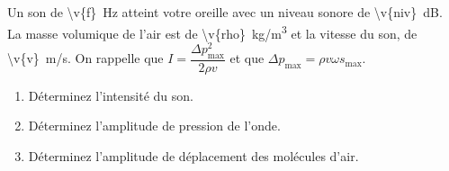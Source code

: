 Un son de \qty{\v{f}}{Hz} atteint votre oreille avec un niveau sonore de \qty{\v{niv}}{dB}. La masse volumique de l'air est de \qty{\v{rho}}{kg/m^3} et la vitesse du son, de \qty{\v{v}}{m/s}. On rappelle que $I = \dfrac{\Delta p_{\max}^2}{2\rho v}$ et que $\Delta p_{\max} = \rho v \omega s_{\max}$.

\begin{enumerate}[label=\alph*)]
    \item Déterminez l'intensité du son.
    \item Déterminez l'amplitude de pression de l'onde.
    \item Déterminez l'amplitude de déplacement des molécules d'air.
\end{enumerate}
